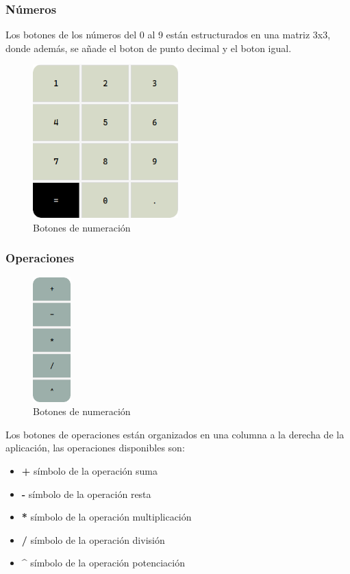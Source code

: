 \documentclass[a4paper,12pt]{article}
\begin{document}
\subsubsection{Números}
Los botones de los números del 0 al 9 están estructurados en una matriz 3x3, donde además, se añade el boton de punto decimal y el boton igual.
\begin{figure}[h!]
    \centering
    \includegraphics[width=0.5\textwidth]{../img/botones.png}
    \caption{Botones de numeración}
    \label{fig: botones}
\end{figure}
\subsubsection{Operaciones}
\begin{figure}[h!]
    \centering
    \includegraphics[width=0.13\textwidth]{../img/operaciones.png}
    \caption{Botones de numeración}
    \label{fig: operaciones}
\end{figure}
Los botones de operaciones están organizados en una columna a la derecha de la aplicación, las operaciones disponibles son:
\begin{itemize}
    \item \textbf{+} símbolo de la operación suma 
    \item \textbf{-} símbolo de la operación resta
    \item \textbf{*} símbolo de la operación multiplicación 
    \item \textbf{/} símbolo de la operación división 
    \item \textbf{\^} símbolo de la operación potenciación 
\end{itemize}
\end{document}

